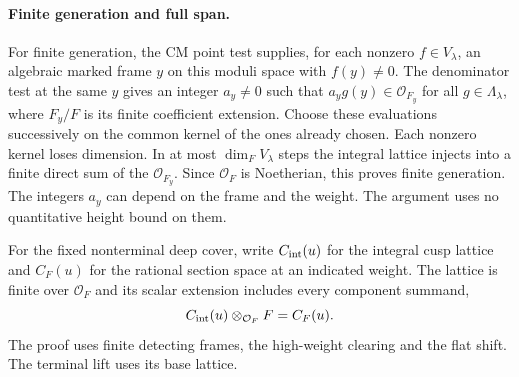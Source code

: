 \paragraph{Finite generation and full span.}
For finite generation, the CM point test supplies, for each
nonzero \(f\in V_\lambda\), an algebraic marked frame \(y\)
on this moduli space with \(f(y)\ne0\). The denominator test
at the same \(y\) gives an integer \(a_y\ne0\) such that
\(a_y g(y)\in\mathcal O_{F_y}\) for all \(g\in\Lambda_\lambda\),
where \(F_y/F\) is its finite coefficient extension. Choose
these evaluations successively on the common kernel of the
ones already chosen. Each nonzero kernel loses dimension.
In at most \(\dim_F V_\lambda\) steps the integral lattice
injects into a finite direct sum of the \(\mathcal O_{F_y}\).
Since \(\mathcal O_F\) is Noetherian, this proves finite
generation. The integers \(a_y\) can depend on the frame
and the weight. The argument uses no quantitative height
bound on them.
\label{cor:deep-cover-on-core-8}

\begin{proposition}
\label{prop:deep-cover-full-lattice}
For the fixed nonterminal deep cover, write \(C_{\rm int}(u)\) for the integral cusp lattice and \(C_F(u)\) for the rational section space at an indicated weight. The lattice is finite over \(\mathcal O_F\) and its scalar extension includes every component summand,
\[
 C_{\rm int}(u)\otimes_{\mathcal O_F}F=C_F(u).
\]
 The proof uses finite detecting frames,
the high-weight clearing and the flat shift. The terminal lift
uses its base lattice.
\end{proposition}

